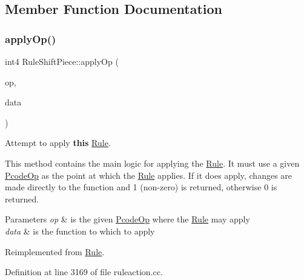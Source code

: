 \subsection{Member Function Documentation}
\mbox{\label{class_rule_shift_piece_a6ba7f2b28202933238d037dd1706992c}} 
\subsubsection{\texorpdfstring{applyOp()}{applyOp()}}
{\footnotesize\ttfamily int4 Rule\+Shift\+Piece\+::apply\+Op (\begin{DoxyParamCaption}\item[{\mbox{\hyperlink{class_pcode_op}{Pcode\+Op}} $\ast$}]{op,  }\item[{\mbox{\hyperlink{class_funcdata}{Funcdata}} \&}]{data }\end{DoxyParamCaption})\hspace{0.3cm}{\ttfamily [virtual]}}



Attempt to apply {\bfseries{this}} \mbox{\hyperlink{class_rule}{Rule}}. 

This method contains the main logic for applying the \mbox{\hyperlink{class_rule}{Rule}}. It must use a given \mbox{\hyperlink{class_pcode_op}{Pcode\+Op}} as the point at which the \mbox{\hyperlink{class_rule}{Rule}} applies. If it does apply, changes are made directly to the function and 1 (non-\/zero) is returned, otherwise 0 is returned. 
\begin{DoxyParams}{Parameters}
{\em op} & is the given \mbox{\hyperlink{class_pcode_op}{Pcode\+Op}} where the \mbox{\hyperlink{class_rule}{Rule}} may apply \\
\hline
{\em data} & is the function to which to apply \\
\hline
\end{DoxyParams}


Reimplemented from \mbox{\hyperlink{class_rule_a4e3e61f066670175009f60fb9dc60848}{Rule}}.



Definition at line 3169 of file ruleaction.\+cc.

